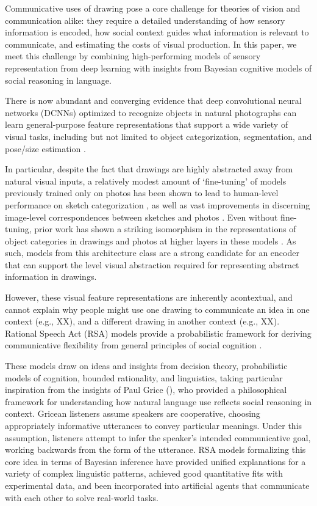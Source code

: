 \documentclass[9pt,twocolumn,twoside]{pnas-new}
\begin{document}
Communicative uses of drawing pose a core challenge for theories of vision and communication alike: they require a detailed understanding of how sensory information is encoded, how social context guides what information is relevant to communicate, and estimating the costs of visual production. In this paper, we meet this challenge by combining high-performing models of sensory representation from deep learning with insights from Bayesian cognitive models of social reasoning in language. 

There is now abundant and converging evidence that deep convolutional neural networks (DCNNs) optimized to recognize objects in natural photographs can learn general-purpose feature representations that support a wide variety of visual tasks, including but not limited to object categorization, segmentation, and pose/size estimation \cite[]{hong2016explicit,he2017mask}.

In particular, despite the fact that drawings are highly abstracted away from natural visual inputs, a relatively modest amount of `fine-tuning' of models previously trained only on photos has been shown to lead to human-level performance on sketch categorization \cite[]{yu2015sketch}, as well as vast improvements in discerning image-level correspondences between sketches and photos \cite[]{sangkloy2016sketchy}. Even without fine-tuning, prior work has shown a striking isomorphism in the representations of object categories in drawings and photos at higher layers in these models \cite[]{fan2015common}. As such, models from this architecture class are a strong candidate for an encoder that can support the level visual abstraction required for representing abstract information in drawings.

However, these visual feature representations are inherently acontextual, and cannot explain why people might use one drawing to communicate an idea in one context (e.g., XX), and a different drawing in another context (e.g., XX). Rational Speech Act (RSA) models provide a probabilistic framework for deriving communicative flexibility from general principles of social cognition \cite{GoodmanFrank16_RSATiCS}.  

These models draw on ideas and insights from decision theory, probabilistic models of cognition, bounded rationality, and linguistics, taking particular inspiration from the insights of Paul Grice (\citeyear{grice1975syntax}), who provided a philosophical framework for understanding how natural language use reflects social reasoning in context. Gricean listeners assume speakers are cooperative, choosing appropriately informative utterances to convey particular meanings. Under this assumption, listeners attempt to infer the speaker's intended communicative goal, working backwards from the form of the utterance. RSA models formalizing this core idea in terms of Bayesian inference have provided unified explanations for a variety of complex linguistic patterns, achieved good quantitative fits with experimental data, and been incorporated into artificial agents that communicate with each other to solve real-world tasks.
\end{document}
